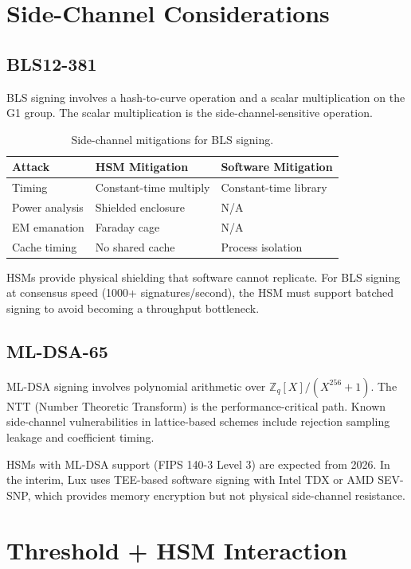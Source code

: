 \documentclass[11pt]{article}
\begin{document}
\section{Side-Channel Considerations}

\subsection{BLS12-381}

BLS signing involves a hash-to-curve operation and a scalar multiplication on the G1 group. The scalar multiplication is the side-channel-sensitive operation.

\begin{table}[h]
\centering
\begin{tabular}{@{}lll@{}}
\toprule
\textbf{Attack} & \textbf{HSM Mitigation} & \textbf{Software Mitigation} \\
\midrule
Timing & Constant-time multiply & Constant-time library \\
Power analysis & Shielded enclosure & N/A \\
EM emanation & Faraday cage & N/A \\
Cache timing & No shared cache & Process isolation \\
\bottomrule
\end{tabular}
\caption{Side-channel mitigations for BLS signing.}
\label{tab:side-channel-bls}
\end{table}

HSMs provide physical shielding that software cannot replicate. For BLS signing at consensus speed (1000+ signatures/second), the HSM must support batched signing to avoid becoming a throughput bottleneck.

\subsection{ML-DSA-65}

ML-DSA signing involves polynomial arithmetic over $\mathbb{Z}_q[X]/(X^{256}+1)$. The NTT (Number Theoretic Transform) is the performance-critical path. Known side-channel vulnerabilities in lattice-based schemes include rejection sampling leakage and coefficient timing.

HSMs with ML-DSA support (FIPS 140-3 Level 3) are expected from 2026. In the interim, Lux uses TEE-based software signing with Intel TDX or AMD SEV-SNP, which provides memory encryption but not physical side-channel resistance.

\section{Threshold + HSM Interaction}
\end{document}
